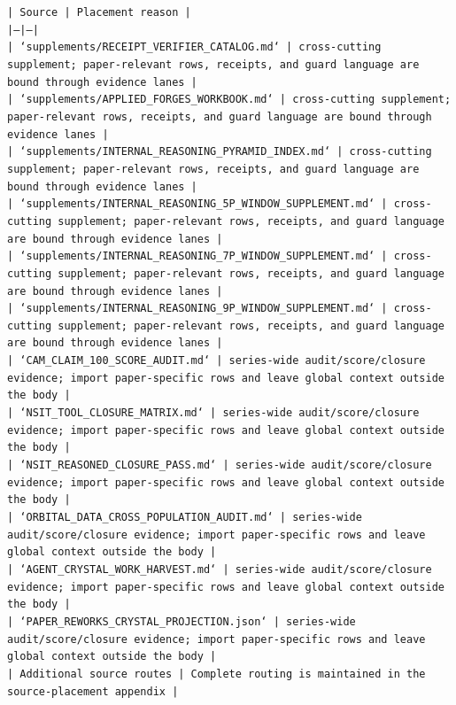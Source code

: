 \documentclass[11pt]{article}
\begin{document}
\noindent\texttt{| Source | Placement reason |}\\
\noindent\texttt{|---|---|}\\
\noindent\texttt{| `supplements/RECEIPT\_VERIFIER\_CATALOG.md` | cross-cutting supplement; paper-relevant rows, receipts, and guard language are bound through evidence lanes |}\\
\noindent\texttt{| `supplements/APPLIED\_FORGES\_WORKBOOK.md` | cross-cutting supplement; paper-relevant rows, receipts, and guard language are bound through evidence lanes |}\\
\noindent\texttt{| `supplements/INTERNAL\_REASONING\_PYRAMID\_INDEX.md` | cross-cutting supplement; paper-relevant rows, receipts, and guard language are bound through evidence lanes |}\\
\noindent\texttt{| `supplements/INTERNAL\_REASONING\_5P\_WINDOW\_SUPPLEMENT.md` | cross-cutting supplement; paper-relevant rows, receipts, and guard language are bound through evidence lanes |}\\
\noindent\texttt{| `supplements/INTERNAL\_REASONING\_7P\_WINDOW\_SUPPLEMENT.md` | cross-cutting supplement; paper-relevant rows, receipts, and guard language are bound through evidence lanes |}\\
\noindent\texttt{| `supplements/INTERNAL\_REASONING\_9P\_WINDOW\_SUPPLEMENT.md` | cross-cutting supplement; paper-relevant rows, receipts, and guard language are bound through evidence lanes |}\\
\noindent\texttt{| `CAM\_CLAIM\_100\_SCORE\_AUDIT.md` | series-wide audit/score/closure evidence; import paper-specific rows and leave global context outside the body |}\\
\noindent\texttt{| `NSIT\_TOOL\_CLOSURE\_MATRIX.md` | series-wide audit/score/closure evidence; import paper-specific rows and leave global context outside the body |}\\
\noindent\texttt{| `NSIT\_REASONED\_CLOSURE\_PASS.md` | series-wide audit/score/closure evidence; import paper-specific rows and leave global context outside the body |}\\
\noindent\texttt{| `ORBITAL\_DATA\_CROSS\_POPULATION\_AUDIT.md` | series-wide audit/score/closure evidence; import paper-specific rows and leave global context outside the body |}\\
\noindent\texttt{| `AGENT\_CRYSTAL\_WORK\_HARVEST.md` | series-wide audit/score/closure evidence; import paper-specific rows and leave global context outside the body |}\\
\noindent\texttt{| `PAPER\_REWORKS\_CRYSTAL\_PROJECTION.json` | series-wide audit/score/closure evidence; import paper-specific rows and leave global context outside the body |}\\
\noindent\texttt{| Additional source routes | Complete routing is maintained in the source-placement appendix |}\\
\end{document}
